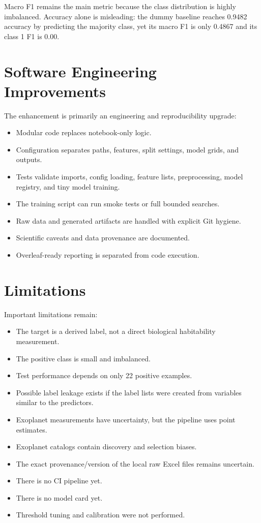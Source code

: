 \documentclass[11pt]{article}
\begin{document}
Macro F1 remains the main metric because the class distribution is highly imbalanced. Accuracy alone is misleading: the dummy baseline reaches 0.9482 accuracy by predicting the majority class, yet its macro F1 is only 0.4867 and its class 1 F1 is 0.00.

\section{Software Engineering Improvements}

The enhancement is primarily an engineering and reproducibility upgrade:

\begin{itemize}
  \item Modular code replaces notebook-only logic.
  \item Configuration separates paths, features, split settings, model grids, and outputs.
  \item Tests validate imports, config loading, feature lists, preprocessing, model registry, and tiny model training.
  \item The training script can run smoke tests or full bounded searches.
  \item Raw data and generated artifacts are handled with explicit Git hygiene.
  \item Scientific caveats and data provenance are documented.
  \item Overleaf-ready reporting is separated from code execution.
\end{itemize}

\section{Limitations}

Important limitations remain:

\begin{itemize}
  \item The target is a derived label, not a direct biological habitability measurement.
  \item The positive class is small and imbalanced.
  \item Test performance depends on only 22 positive examples.
  \item Possible label leakage exists if the label lists were created from variables similar to the predictors.
  \item Exoplanet measurements have uncertainty, but the pipeline uses point estimates.
  \item Exoplanet catalogs contain discovery and selection biases.
  \item The exact provenance/version of the local raw Excel files remains uncertain.
  \item There is no CI pipeline yet.
  \item There is no model card yet.
  \item Threshold tuning and calibration were not performed.
\end{itemize}
\end{document}
